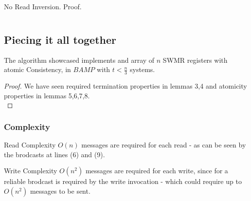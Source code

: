\begin{frame}{No Read Inversion. Proof.}
\begin{columns}[T]
\begin{column}{.5\textwidth}
        \end{column}
    \end{columns}
\end{frame}

\subsection{Piecing it all together}
\begin{frame}
    \begin{theorem}
        The algorithm showcased implements and array of $n$ SWMR
        registers with atomic Consistency, in $BAMP$ with $t<\frac{n}{3}$ systems.
    \end{theorem}
    \begin{proof}
        We have seen required termination properties in lemmas 3,4 and atomicity
        properties in lemmas 5,6,7,8.\\
    \end{proof}
\end{frame}

\begin{frame}
    \frametitle{Complexity}
    
    \begin{block}{Read Complexity}
        \alert{$O(n)$} messages are required for each read - as can be seen
        by the brodcasts at lines (6) and (9).
    \end{block}
    \begin{block}{Write Complexity}
        \alert{$O(n^2)$} messages are required for each write,
        since for a \alert{reliable} brodcast is required
        by the write invocation - which could require up to $O(n^2)$
        messages to be sent. 
    \end{block}
\end{frame}